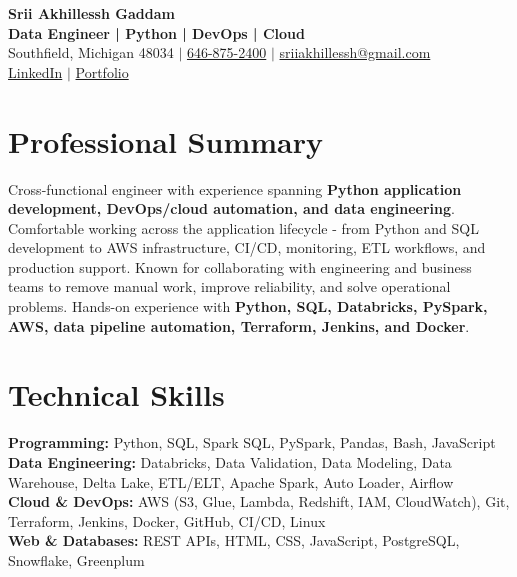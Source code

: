 \documentclass[letterpaper,10pt]{article}
\begin{document}
\fontsize{9.35pt}{10.45pt}\selectfont

\begin{center}
    {\LARGE \textbf{Srii Akhillessh Gaddam}} \\[-1pt]
    \textbf{Data Engineer | Python | DevOps | Cloud} \\[2pt]
    Southfield, Michigan 48034 $|$
    \href{tel:6468752400}{646-875-2400} $|$
    \href{mailto:sriiakhillessh@gmail.com}{sriiakhillessh@gmail.com} \\[1pt]
    \href{https://www.linkedin.com/in/srii-akhiilessh-gaddam-b48668191/}{LinkedIn} $|$
    \href{https://sriiakhillesshg.github.io/portfolio/}{Portfolio}
\end{center}
\vspace{-8pt}

\section{Professional Summary}
\small{Cross-functional engineer with experience spanning \textbf{Python application development, DevOps/cloud automation, and data engineering}. Comfortable working across the application lifecycle - from Python and SQL development to AWS infrastructure, CI/CD, monitoring, ETL workflows, and production support. Known for collaborating with engineering and business teams to remove manual work, improve reliability, and solve operational problems. Hands-on experience with \textbf{Python, SQL, Databricks, PySpark, AWS, data pipeline automation, Terraform, Jenkins, and Docker}.}

\section{Technical Skills}
\small{
\textbf{Programming:} Python, SQL, Spark SQL, PySpark, Pandas, Bash, JavaScript \\
\textbf{Data Engineering:} Databricks, Data Validation, Data Modeling, Data Warehouse, Delta Lake, ETL/ELT, Apache Spark, Auto Loader, Airflow \\
\textbf{Cloud \& DevOps:} AWS (S3, Glue, Lambda, Redshift, IAM, CloudWatch), Git, Terraform, Jenkins, Docker, GitHub, CI/CD, Linux \\
\textbf{Web \& Databases:} REST APIs, HTML, CSS, JavaScript, PostgreSQL, Snowflake, Greenplum
}
\end{document}
